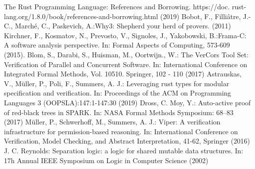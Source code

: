 \documentclass[runningheads]{llncs}
\begin{document}
%
%
%
% 
% 
%
\begin{thebibliography}{8}
  The Rust Programming Language: References and Borrowing. https://doc.
rust-lang.org/1.8.0/book/references-and-borrowing.html (2019)
  Bobot, F., Filli{\^a}tre, J.-C., March{\'e}, C., Paskevich, A.:Why3: Shepherd your herd of provers. (2011)
  Kirchner, F., Kosmatov, N., Prevosto, V., Signoles, J., Yakobowski, B.:Frama-C: A software analysis perspective. In: Formal Aspects of Computing, 573-609 (2015).
Blom, S., Darabi, S., Huisman, M., Oortwijn., W.: The VerCors Tool Set: Verification of Parallel and Concurrent Software. In:  International Conference on Integrated Formal Methods, Vol. 10510. Springer, 102 - 110 (2017)
  Astrauskas, V., M\"uller, P., Poli, F., Summers, A. J.: Leveraging rust types for modular specification and verification.
  In: Proceedings of the ACM on Programming Languages 3 (OOPSLA):147:1-147:30 (2019)
  Dross, C. Moy, Y.: Auto-active proof of red-black trees in SPARK.
  In: NASA Formal Methods Symposium: 68--83 (2017)
Müller, P., Schwerhoff, M., Summers, A. J.: Viper: A verification infrastructure for permission-based reasoning. In: International Conference on Verification, Model Checking, and Abstract Interpretation, 41-62, Springer (2016)
J. C. Reynolds: Separation logic: a logic for shared mutable data structures. In: 17h Annual IEEE
Symposium on Logic in Computer Science (2002)
\end{thebibliography}
\end{document}

